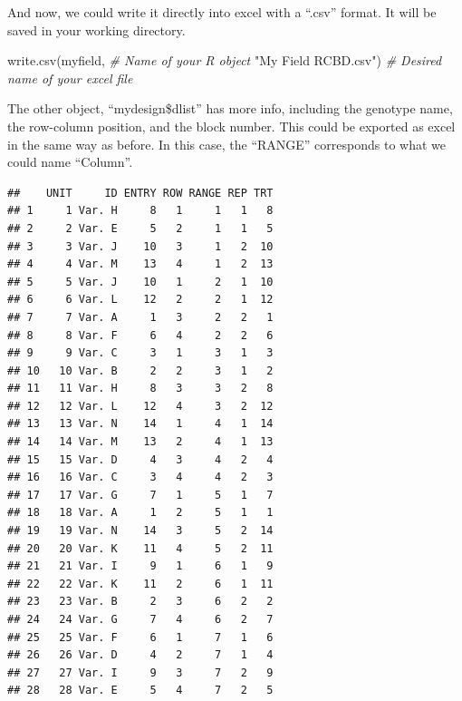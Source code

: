 \documentclass[
]{book}
\newenvironment{Shaded}{\begin{snugshade}}{\end{snugshade}}
\newcommand{\CommentTok}[1]{\textcolor[rgb]{0.56,0.35,0.01}{\textit{#1}}}
\newcommand{\DecValTok}[1]{\textcolor[rgb]{0.00,0.00,0.81}{#1}}
\newcommand{\FunctionTok}[1]{\textcolor[rgb]{0.00,0.00,0.00}{#1}}
\newcommand{\NormalTok}[1]{#1}
\newcommand{\OtherTok}[1]{\textcolor[rgb]{0.56,0.35,0.01}{#1}}
\newcommand{\SpecialCharTok}[1]{\textcolor[rgb]{0.00,0.00,0.00}{#1}}
\newcommand{\StringTok}[1]{\textcolor[rgb]{0.31,0.60,0.02}{#1}}
\begin{document}
\begin{Shaded}
\end{Shaded}

And now, we could write it directly into excel with a ``.csv'' format. It will be saved in your working directory.

\begin{Shaded}
\begin{Highlighting}[]
\FunctionTok{write.csv}\NormalTok{(myfield,                    }\CommentTok{\# Name of your R object}
          \StringTok{"My Field RCBD.csv"}\NormalTok{)        }\CommentTok{\# Desired name of your excel file}
\end{Highlighting}
\end{Shaded}

The other object, ``mydesign\$dlist'' has more info, including the genotype name, the row-column position, and the block number. This could be exported as excel in the same way as before. In this case, the ``RANGE'' corresponds to what we could name ``Column''.

\begin{Shaded}
\end{Shaded}

\begin{verbatim}
##    UNIT     ID ENTRY ROW RANGE REP TRT
## 1     1 Var. H     8   1     1   1   8
## 2     2 Var. E     5   2     1   1   5
## 3     3 Var. J    10   3     1   2  10
## 4     4 Var. M    13   4     1   2  13
## 5     5 Var. J    10   1     2   1  10
## 6     6 Var. L    12   2     2   1  12
## 7     7 Var. A     1   3     2   2   1
## 8     8 Var. F     6   4     2   2   6
## 9     9 Var. C     3   1     3   1   3
## 10   10 Var. B     2   2     3   1   2
## 11   11 Var. H     8   3     3   2   8
## 12   12 Var. L    12   4     3   2  12
## 13   13 Var. N    14   1     4   1  14
## 14   14 Var. M    13   2     4   1  13
## 15   15 Var. D     4   3     4   2   4
## 16   16 Var. C     3   4     4   2   3
## 17   17 Var. G     7   1     5   1   7
## 18   18 Var. A     1   2     5   1   1
## 19   19 Var. N    14   3     5   2  14
## 20   20 Var. K    11   4     5   2  11
## 21   21 Var. I     9   1     6   1   9
## 22   22 Var. K    11   2     6   1  11
## 23   23 Var. B     2   3     6   2   2
## 24   24 Var. G     7   4     6   2   7
## 25   25 Var. F     6   1     7   1   6
## 26   26 Var. D     4   2     7   1   4
## 27   27 Var. I     9   3     7   2   9
## 28   28 Var. E     5   4     7   2   5
\end{verbatim}
\end{document}
